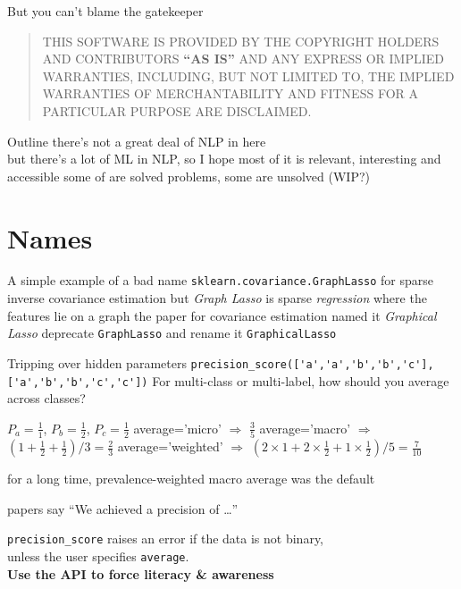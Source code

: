 \documentclass[aspectratio=169, 22pt]{beamer}
\newcommand{\hl}{\textcolor{usydred}}
\begin{document}
\begin{centre}{But you can't blame the gatekeeper}
	\begin{quote}
	THIS SOFTWARE IS PROVIDED BY THE COPYRIGHT HOLDERS AND CONTRIBUTORS \textbf{``AS IS''}
	AND ANY EXPRESS OR IMPLIED WARRANTIES, INCLUDING, BUT NOT LIMITED TO, THE
	IMPLIED WARRANTIES OF MERCHANTABILITY AND FITNESS FOR A PARTICULAR PURPOSE
	ARE DISCLAIMED.
	\end{quote}
\end{centre}



\begin{points}{Outline}
	\p there's not a great deal of NLP in here \\
	but there's a lot of ML in NLP, so I hope most of it is relevant, interesting and accessible
	\p some of are solved problems, some are unsolved (WIP?)
\end{points}



\section{Names}

\begin{points}{A simple example of a bad name}
	\p \verb|sklearn.covariance.GraphLasso| for sparse inverse covariance estimation
	\p but \emph{Graph Lasso} is sparse \emph{regression} where the features lie on a graph
	\p the paper for covariance estimation named it \emph{Graphical Lasso}
	\pause
	\p[Solution] deprecate \verb|GraphLasso| and rename it \verb|GraphicalLasso|
\end{points}

\begin{points}{Tripping over hidden parameters}
	\p 
\verb|precision_score(['a','a','b','b','c'], ['a','b','b','c','c'])|
	\p For multi-class or multi-label, how should you average across classes?
	\begin{itemize}
\p $P_a = \frac{1}{1}$, $P_b = \frac{1}{2}$, $P_c = \frac{1}{2}$
\p average='micro' $\Rightarrow$ $\frac{3}{5}$
\p average='macro' $\Rightarrow$ $(1 + \frac{1}{2} + \frac{1}{2}) / 3 = \frac{2}{3}$
\p average='weighted' $\Rightarrow$ $(2\times1 + 2\times\frac{1}{2} + 1\times\frac{1}{2}) / 5 = \frac{7}{10}$
	\end{itemize}
	\p for a long time, prevalence-weighted macro average was the default
	\begin{itemize}
	\p[$\therefore$] papers say ``We achieved a precision of \dots''
	\end{itemize}
	\pause
\p[Solution] \verb|precision_score| raises an error if the data is not binary,\\
unless the user specifies \verb|average|. \pause\\ \hfill \textbf{\hl{Use the API to force literacy \& awareness}}
\end{points}
\end{document}
